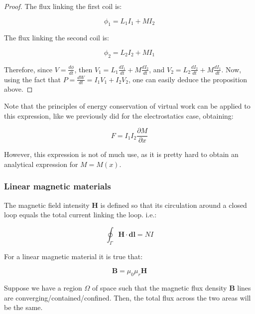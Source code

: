 \documentclass{article}
\begin{document}
\begin{proof}
    The flux linking the first coil is:

    \[ \phi_1 = L_1I_1 + MI_2 \]

    The flux linking the second coil is:

    \[ \phi_2 = L_2I_2 + MI_1 \]

    Therefore, since $V = \frac{d\phi}{dt}$, then $V_1 = L_1\frac{dI_1}{dt} + M\frac{dI_2}{dt}$, and $V_2 = L_2\frac{dI_2}{dt} + M\frac{dI_1}{dt}$. Now, using the fact that $P = \frac{dW}{dt} = I_1V_1 + I_2V_2$, one can easily deduce the proposition above.
\end{proof}

Note that the principles of energy conservation of virtual work can be applied to this expression, like we previously did for the electrostatics case, obtaining:

\[ F = I_1I_2\frac{\partial M}{\partial x} \]

However, this expression is not of much use, as it is pretty hard to obtain an analytical expression for $M = M(x)$.

\newpage

\subsubsection{Linear magnetic materials}

\begin{definition}
    The magnetic field intensity $\mathbf{H}$ is defined so that its circulation around a closed loop equals the total current linking the loop. i.e.:

    \[ \oint_\Gamma \mathbf{H} \cdot \mathbf{dl} = NI \]
\end{definition}

\begin{proposition}
    For a linear magnetic material it is true that:

    \[ \mathbf{B} = \mu_0\mu_r\mathbf{H} \]
\end{proposition}

\begin{theorem}
    Suppose we have a region $\Omega$ of space such that the magnetic flux density $\mathbf{B}$ lines are converging/contained/confined. Then, the total flux across the two areas will be the same.
\end{theorem}
\end{document}
